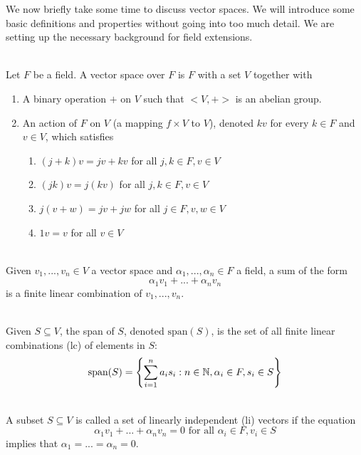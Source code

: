 We now briefly take some time to discuss vector spaces. We will introduce some basic definitions and properties without going into too much detail. We are setting up the necessary background for field extensions.

\begin{definition} \leavevmode \\
    Let $F$ be a field. A vector space over $F$ is $F$ with a set $V$ together with
    \begin{enumerate}
        \item A binary operation $+$ on $V$ such that $<V,+>$ is an abelian group.
        \item An action of $F$ on $V$ (a mapping $f\times V$ to $V$), denoted $kv$ for every $k \in F$ and $v \in V$, which satisfies
        \begin{enumerate}
            \item $(j+k)v = jv + kv$ for all $j,k \in F, v \in V$
            \item $(jk)v = j(kv)$ for all $j,k \in F, v\in V$
            \item $j(v+w) = jv + jw$ for all $j \in F, v,w \in V$
            \item $1v = v$ for all $v \in V$
        \end{enumerate}
    \end{enumerate}
\end{definition}

\begin{definition} \leavevmode \\
    Given $v_1, ..., v_n \in V$ a vector space and $\alpha_1, ..., \alpha_n \in F$ a field, a sum of the form
    $$\alpha_1v_1 + ...+\alpha_n v_n$$
    is a finite linear combination of $v_1, ..., v_n$.    
\end{definition}

\begin{definition} \leavevmode \\
    Given $S \subseteq V$, the span of $S$, denoted $\text{span}(S)$, is the set of all finite linear combinations (lc) of elements in $S$:
    $$\text{span}(S) = \left\{\sum_{i=1}^{n}a_is_i : n \in \mathbb{N}, \alpha_i \in F, s_i \in S\right\}$$
\end{definition}

\begin{definition} \leavevmode \\
    A subset $S \subseteq V$ is called a set of linearly independent (li) vectors if the equation
    $$\alpha_1v_1 + ... + \alpha_n v_n = 0 \text{ for all } \alpha_i \in F, v_i \in S$$
    implies that $\alpha_1 = ... = \alpha_n = 0$.
\end{definition}

